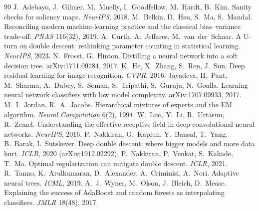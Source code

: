 \begin{thebibliography}{99}\small
{} J.~Adebayo, J.~Gilmer, M.~Muelly, I.~Goodfellow, M.~Hardt, B.~Kim. Sanity checks for saliency maps. \emph{NeurIPS}, 2018.
 M.~Belkin, D.~Hsu, S.~Ma, S.~Mandal. Reconciling modern machine-learning practice and the classical bias--variance trade-off. \emph{PNAS} 116(32), 2019.
 A.~Curth, A.~Jeffares, M.~van~der~Schaar. A U-turn on double descent: rethinking parameter counting in statistical learning. \emph{NeurIPS}, 2023.
 N.~Frosst, G.~Hinton. Distilling a neural network into a soft decision tree. arXiv:1711.09784, 2017.
 K.~He, X.~Zhang, S.~Ren, J.~Sun. Deep residual learning for image recognition. \emph{CVPR}, 2016.
 Jayadeva, H.~Pant, M.~Sharma, A.~Dubey, S.~Soman, S.~Tripathi, S.~Guruju, N.~Goalla. Learning neural network classifiers with low model complexity. arXiv:1707.09933, 2017.
 M.~I.~Jordan, R.~A.~Jacobs. Hierarchical mixtures of experts and the EM algorithm. \emph{Neural Computation} 6(2), 1994.
 W.~Luo, Y.~Li, R.~Urtasun, R.~Zemel. Understanding the effective receptive field in deep convolutional neural networks. \emph{NeurIPS}, 2016.
 P.~Nakkiran, G.~Kaplun, Y.~Bansal, T.~Yang, B.~Barak, I.~Sutskever. Deep double descent: where bigger models and more data hurt. \emph{ICLR}, 2020 (arXiv:1912.02292).
 P.~Nakkiran, P.~Venkat, S.~Kakade, T.~Ma. Optimal regularization can mitigate double descent. \emph{ICLR}, 2021.
 R.~Tanno, K.~Arulkumaran, D.~Alexander, A.~Criminisi, A.~Nori. Adaptive neural trees. \emph{ICML}, 2019.
 A.~J.~Wyner, M.~Olson, J.~Bleich, D.~Mease. Explaining the success of AdaBoost and random forests as interpolating classifiers. \emph{JMLR} 18(48), 2017.
\end{thebibliography}
